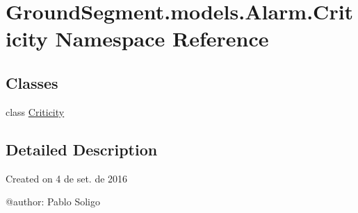 \hypertarget{namespace_ground_segment_1_1models_1_1_alarm_1_1_criticity}{}\section{Ground\+Segment.\+models.\+Alarm.\+Criticity Namespace Reference}
\label{namespace_ground_segment_1_1models_1_1_alarm_1_1_criticity}
\subsection*{Classes}
\begin{DoxyCompactItemize}
\item 
class \hyperlink{class_ground_segment_1_1models_1_1_alarm_1_1_criticity_1_1_criticity}{Criticity}
\end{DoxyCompactItemize}


\subsection{Detailed Description}
\begin{DoxyVerb}Created on 4 de set. de 2016

@author: Pablo Soligo
\end{DoxyVerb}
 